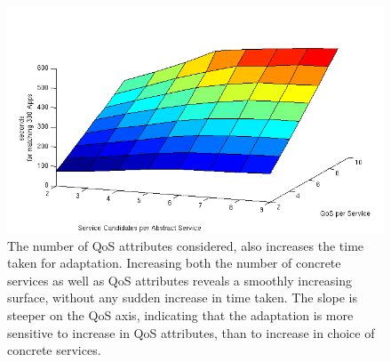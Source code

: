 \documentclass[10pt,journal,compsoc]{IEEEtran}
\begin{document}
\begin{figure}
    \includegraphics[scale=0.53]{graphs/Qa-vs-SvcCandidate-Time-Growth.png}
    \caption{The number of QoS attributes considered, also increases the time taken for adaptation. Increasing both the number of concrete services as well as QoS attributes reveals a smoothly increasing surface, without any sudden increase in time taken. The slope is steeper on the QoS axis, indicating that the adaptation is more sensitive to increase in QoS attributes, than to increase in choice of concrete services.}
     \label{time_surface}
\end{figure}
\end{document}
